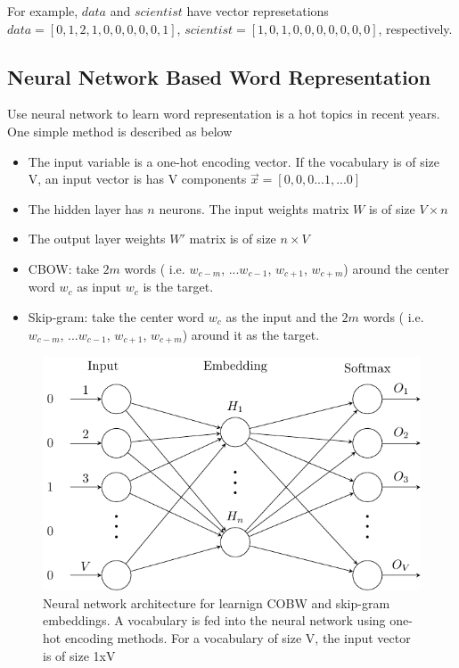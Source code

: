 \documentclass[12pt, oneside]{article}
\begin{document}
For example, $data$ and $scientist$ have vector represetations $data=[0, 1, 2, 1, 0, 0, 0, 0, 0, 1]$, $scientist=[1, 0, 1, 0, 0, 0, 0, 0, 0, 0]$, respectively.


\subsection{Neural Network Based Word Representation}

Use neural network to learn word representation is a hot topics in recent years. One simple method is described as below

\begin{itemize}

\item The input variable is a one-hot encoding vector. If the vocabulary is of size V, an input vector is has V components ${\vec{x}=[0, 0, 0 ...1, ...0]}$ 
\item The hidden layer has $n$ neurons. The input weights matrix ${W}$ is of size ${V\times n}$
\item The output layer weights ${W}'$ matrix is of size ${n\times V}$
\item CBOW: take $2m$ words ( i.e. ${w_{c-m}}$, ...${w_{c-1}}$, ${w_{c+1}}$, ${w_{c+m}}$) around the center word ${w_c}$ as input  ${w_c}$ is the target.
\item Skip-gram: take the center word ${w_c}$ as the input and the $2m$ words ( i.e. ${w_{c-m}}$, ...${w_{c-1}}$, ${w_{c+1}}$, ${w_{c+m}}$) around it as the target.

\end{itemize}


\begin{figure}
\center
\includegraphics[scale=1,page=1]{Figures/wordembedding.pdf}
\caption{Neural network architecture for learnign COBW and skip-gram embeddings. A vocabulary is fed into the neural network using one-hot encoding methods. For a vocabulary of size V, the input vector is of size 1xV
 }
\end{figure}
\end{document}
